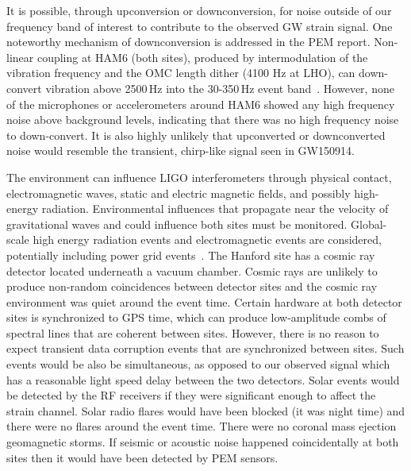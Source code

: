 It is possible, through upconversion or downconversion, for noise outside of our frequency band of interest to contribute to the observed GW strain signal. One noteworthy mechanism of downconversion is addressed in the PEM report. Non-linear coupling at HAM6 (both sites), produced by intermodulation of the vibration frequency and the OMC length dither (4100 Hz at LHO), can down-convert vibration above 2500\,Hz into the 30-350\,Hz event band~\cite{pem_GW150914}. However, none of the microphones or accelerometers around HAM6 showed any high frequency noise above background levels, indicating that there was no high frequency noise to down-convert. It is also highly unlikely that upconverted or downconverted noise would resemble the transient, chirp-like signal seen in GW150914.

The environment can influence LIGO interferometers through physical contact, electromagnetic waves, static and electric magnetic fields, and possibly high-energy radiation. Environmental influences that propagate near the velocity of gravitational waves and could influence both sites must be monitored. Global-scale high energy radiation events and electromagnetic events are considered, potentially including power grid events~\cite{pem_GW150914}. The Hanford site has a cosmic ray detector located underneath a vacuum chamber. Cosmic rays are unlikely to produce non-random coincidences between detector sites and the cosmic ray environment was quiet around the event time. Certain hardware at both detector sites is synchronized to GPS time, which can produce low-amplitude combs of spectral lines that are coherent between sites. However, there is no reason to expect transient data corruption events that are synchronized between sites. Such events would be also be simultaneous, as opposed to our observed signal which has a reasonable light speed delay between the two detectors. Solar events would be detected by the RF receivers if they were significant enough to affect the strain channel. Solar radio flares would have been blocked (it was night time) and there were no flares around the event time. There were no coronal mass ejection geomagnetic storms. If seismic or acoustic noise happened coincidentally at both sites then it would have been detected by PEM sensors.

